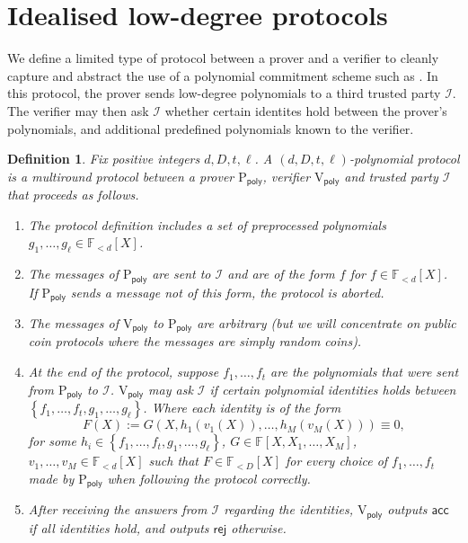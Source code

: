 \documentclass[11pt]{article} %
\newcommand{\F}{\ensuremath{\mathbb F}\xspace}
\newcommand{\rej}{\ensuremath{\mathsf{rej}}\xspace}
\newcommand{\acc}{\ensuremath{\mathsf{acc}}\xspace}
\newcommand{\defeq}{:=}
\newcommand{\prvpoly}{\ensuremath{\mathrm{P_{\mathsf{poly}}}}\xspace}
\newcommand{\verpoly}{\ensuremath{\mathrm{V_{\mathsf{poly}}}}\xspace}
\newcommand{\ideal}{\ensuremath{\mathcal{I}}\xspace}
\newcommand{\set}[1]{\ensuremath{\left\{#1\right\}}\xspace}
\newcommand{\polysofdeg}[1]{\ensuremath{\F_{< #1}[X]}\xspace}
\newtheorem{dfn}[lemma]{Definition}
\begin{document}
\section{Idealised low-degree protocols}\label{sec:polyprot}
We define a limited type of protocol between a prover and a verifier to cleanly capture and abstract the use of a polynomial commitment scheme such as \cite{kate}.
 In this protocol, the prover sends low-degree polynomials to a third trusted party \ideal.
The verifier may then ask \ideal whether certain identites hold between the prover's polynomials, and additional predefined polynomials known to the verifier.
\begin{dfn}\label{dfn:polyprotocol}
Fix positive integers $d,D,t,\ell$.
A \emph{$(d,D,t,\ell)$-polynomial protocol} is a multiround protocol between a prover \prvpoly, verifier 
\verpoly and trusted party \ideal that proceeds as follows.

\begin{enumerate}
\item The protocol definition includes a set of \emph{preprocessed polynomials} $g_1,\ldots,g_\ell \in \polysofdeg{d}$.

\item The messages of \prvpoly are sent to \ideal and are of the form $f$ for $f\in \polysofdeg{d}$. If \prvpoly sends a message not of this form, the protocol is aborted.
 
 
\item The messages of  \verpoly to \prvpoly are arbitrary (but we will concentrate on public coin protocols where the messages are simply random coins).


 \item At the end of the protocol, suppose $f_1,\ldots,f_t$ are the polynomials that were sent from \prvpoly to \ideal. \verpoly may ask \ideal if certain polynomial identities holds between \set{f_1,\ldots,f_t,g_1,\ldots,g_\ell}.
 Where each identity is of the form
 \[F(X)\defeq G(X, h_1(v_1(X)),\ldots,h_M(v_M(X)))\equiv 0,\]
 for some $h_i\in  \set{f_1,\ldots,f_t,g_1,\ldots,g_\ell}$, $G\in \F[X,X_1,\ldots,X_{M}]$, $v_1,\ldots,v_{M} \in \polysofdeg{d}$
 such that $F\in \polysofdeg{D}$ for every choice of $f_1,\ldots,f_t$ made by \prvpoly when following the protocol correctly.
 
 
 
 \item After receiving the answers from \ideal regarding the identities, \verpoly outputs \acc if all identities hold, and outputs \rej otherwise.

\end{enumerate}
 
\end{dfn}
\end{document}
